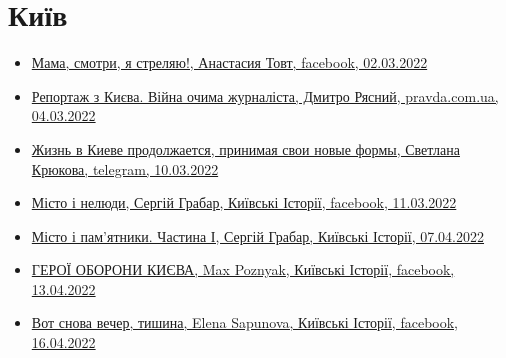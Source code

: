  
 
 
 
 

\section{Київ}
\label{sec:topics.vojna.kiev}

\begin{itemize} %
\item \hyperlink{02_03_2022.fb.tovt_anastasia.1.mama_smotri_ja_streljaju}{%
Мама, смотри, я стреляю!, Анастасия Товт, facebook, 02.03.2022%
}

\item \hyperlink{04_03_2022.stz.news.ua.pravda.1.reportazh_z_kieva}{%
Репортаж з Києва. Війна очима журналіста, Дмитро Рясний, pravda.com.ua, 04.03.2022%
}

\item \hyperlink{10_03_2022.tg.krjukova_svetlana.1.zhizn_v_kieve}{%
Жизнь в Киеве продолжается, принимая свои новые формы, Светлана Крюкова, telegram, 10.03.2022
}

\item \hyperlink{11_03_2022.fb.fb_group.story_kiev_ua.2.misto_i_neljudy}{%
Місто і нелюди, Сергій Грабар, Київські Історії, facebook, 11.03.2022%
}

\item \hyperlink{07_04_2022.fb.fb_group.story_kiev_ua.1.misto_i_pamjatnyky_chastyna_1}{%
Місто і пам'ятники. Частина І, Сергій Грабар, Київські Історії, 07.04.2022%
}

\item \hyperlink{13_04_2022.fb.fb_group.story_kiev_ua.1.geroi_oborony_kieva}{%
ГЕРОЇ ОБОРОНИ КИЄВА, Max Poznyak, Київські Історії, facebook, 13.04.2022%
}

\item \hyperlink{16_04_2022.fb.fb_group.story_kiev_ua.1.vecher_tishina}{%
Вот снова вечер, тишина, Elena Sapunova, Київські Історії, facebook, 16.04.2022%
}

\end{itemize} %
